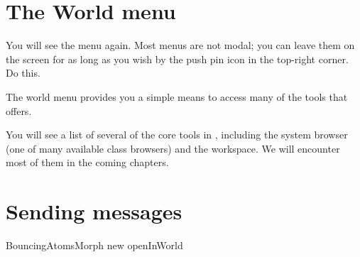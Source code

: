 \documentclass[a4paper,10pt,twoside]{book}
\begin{document}
\section{The World menu}

You will see the  menu again.
Most \pharo menus are not modal; you can leave them on the screen for as long as you wish by  the push pin icon in the top-right corner. Do this.

The world menu provides you a simple means to access many of the tools that \pharo offers.


You will see a list of several of the core tools in \pharo, including the system browser (one of many available class browsers) and the workspace.
We will encounter most of them in the coming chapters.

\section{Sending messages}


\begin{code}{}
BouncingAtomsMorph new openInWorld
\end{code}

\end{document}
